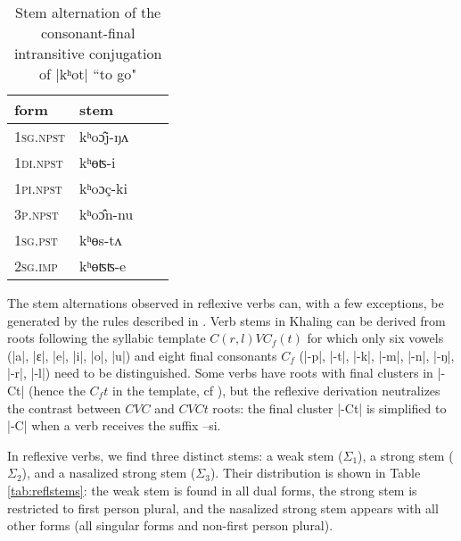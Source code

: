 \documentclass[twoside,a4paper,11pt]{article}
\newcommand{\ipa}[1]{{\phon#1}}
\newcommand{\ra}{$\Sigma_1$}
\newcommand{\rbb}{$\Sigma_2$}
\newcommand{\rc}{$\Sigma_3$}
\begin{document}
\begin{table}[H]
\caption{Stem alternation of  the consonant-final intransitive conjugation  of |\ipa{kʰot}| ``to go"} \label{tab:khot} \centering
\begin{tabular}{llll}
\toprule
form&stem\\
\midrule
\textsc{1sg.npst}&\ipa{kʰoɔ̂j-ŋʌ} \\
\textsc{1di.npst}&\ipa{kʰɵʦ-i} \\
\textsc{1pi.npst}&\ipa{kʰoɔç-ki} \\
\textsc{3p.npst}&\ipa{kʰoɔ̂n-nu} \\
\textsc{1sg.pst}&\ipa{kʰɵs-tʌ} \\
\textsc{2sg.imp}&\ipa{kʰɵʦʦ-e} \\
\bottomrule
\end{tabular}
\end{table}

The stem  alternations observed in reflexive verbs can, with a few exceptions, be generated by the rules  described in  \citet[1108-1111]{jacques12khaling}. Verb stems in Khaling can be derived from roots following the syllabic template $C(r,l)VC_f(t)$ for which only six vowels (|\ipa{a}|, |\ipa{ɛ}|, |\ipa{e}|, |\ipa{i}|, |\ipa{o}|, |\ipa{u}|) and eight final consonants $C_f$ (|\ipa{-p}|, |\ipa{-t}|, |\ipa{-k}|, |\ipa{-m}|, |\ipa{-n}|, |\ipa{-ŋ}|, |\ipa{-r}|, |\ipa{-l}|) need to be distinguished. Some verbs have roots with final clusters in |\ipa{-Ct}| (hence the $C_ft$ in the template, cf \citealt[1119-1122]{jacques12khaling}), but the reflexive derivation neutralizes the contrast between $CVC$ and $CVCt$ roots: the final cluster |\ipa{-Ct}| is simplified to |\ipa{-C}| when a verb receives the suffix --\ipa{si}.

In reflexive verbs, we find three distinct stems: a weak stem (\ra{}), a strong stem (\rbb{}), and a nasalized strong stem (\rc{}). Their distribution is shown in Table \ref{tab:reflstems}: 
the weak stem is found in all dual forms, the strong stem is restricted to first person plural, and the nasalized strong stem appears with all other forms (all singular forms and non-first person plural).
\end{document}
